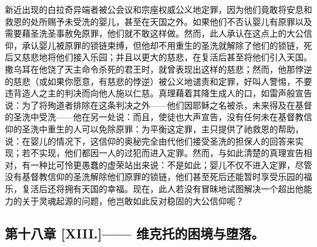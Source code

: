 新近出现的白拉奇异端者被公会议和宗座权威公义地定罪，因为他们竟敢将安息和救恩的处所赐予未受洗的婴儿，甚至在天国之外。如果他们不否认婴儿有原罪以及需要藉圣洗圣事赦免原罪，他们就不敢这样做。然而，此人承认在这点上的大公信仰，承认婴儿被原罪的锁链束缚，但他却不用重生的圣洗就解除了他们的锁链，死后又慈悲地将他们接入乐园；并且以更大的慈悲，在复活后甚至将他们引入天国。撒乌耳在他饶了天主命令杀死的君王时，就曾表现出这样的慈悲；然而，他那悖逆的慈悲（或如果你愿意，有慈悲的悖逆）被公义地谴责和定罪，好叫人警惕，不要违背造人之主的判决而向他人施以仁慈。真理藉着其降生成人的口，如雷声般宣告说：为了将殉道者排除在这条判决之外——他们因耶稣之名被杀，未来得及在基督的圣洗中受洗——他在另一处说：而且，使徒也大声宣告，没有任何未在基督教信仰的圣洗中重生的人可以免除原罪：为平衡这定罪，主只提供了祂救恩的帮助，说：在婴儿的情况下，这信仰的奥秘完全由代他们接受圣洗的担保人的回答来实现；若不实现，他们都因一人的过犯而进入定罪。然而，与如此清楚的真理宣告相对，有一种比可怜更愚蠢的虚荣站出来说：不是如此；婴儿不仅不进入定罪，尽管没有基督教信仰的圣洗解除他们原罪的锁链，他们甚至死后还能暂时享受乐园的福乐，复活后还将拥有天国的幸福。现在，此人若没有冒昧地试图解决一个超出他能力的关于灵魂起源的问题，他岂敢如此反对稳固的大公信仰呢？\par


\subsection{第十八章 [XIII.]—— 维克托的困境与堕落。}

